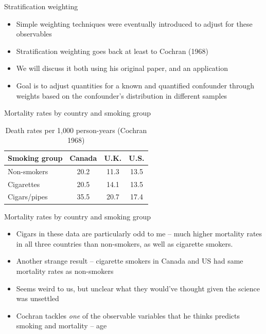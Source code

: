 \documentclass{beamer}
\begin{document}
\begin{frame}{Stratification weighting}

\begin{itemize}
\item Simple weighting techniques were eventually introduced to adjust for these observables
\item Stratification weighting goes back at least to Cochran (1968)
\item We will discuss it both using his original paper, and an application
\item Goal is to adjust quantities for a known and quantified confounder through weights based on the confounder's distribution in different samples
\end{itemize}

\end{frame}




\begin{frame}{Mortality rates by country and smoking group}
	
	\begin{table}\centering
		\caption{Death rates per 1,000 person-years (Cochran 1968)}
		\begin{center}
		\begin{tabular}{lccc}
		\hline \hline
		\multicolumn{1}{l}{Smoking group}&
		\multicolumn{1}{c}{Canada}&
		\multicolumn{1}{c}{U.K.}&
		\multicolumn{1}{c}{U.S.}\\
		\hline
		Non-smokers & 20.2 & 11.3 & 13.5\\
		Cigarettes & 20.5 & 14.1 & 13.5 \\
		Cigars/pipes & 35.5 & 20.7 & 17.4\\
		\hline
		\end{tabular}
		\end{center}
	\end{table}
	
	
\end{frame}

\begin{frame}{Mortality rates by country and smoking group}

\begin{itemize}
\item Cigars in these data are particularly odd to me -- much higher mortality rates in all three countries than non-smokers, as well as cigarette smokers. 
\item Another strange result -- cigarette smokers in Canada and US had same mortality rates as non-smokers
\item Seems weird to us, but unclear what they would've thought given the science was unsettled
\item Cochran tackles \emph{one} of the observable variables that he thinks predicts smoking and mortality -- age

\end{itemize}

\end{frame}
\end{document}
